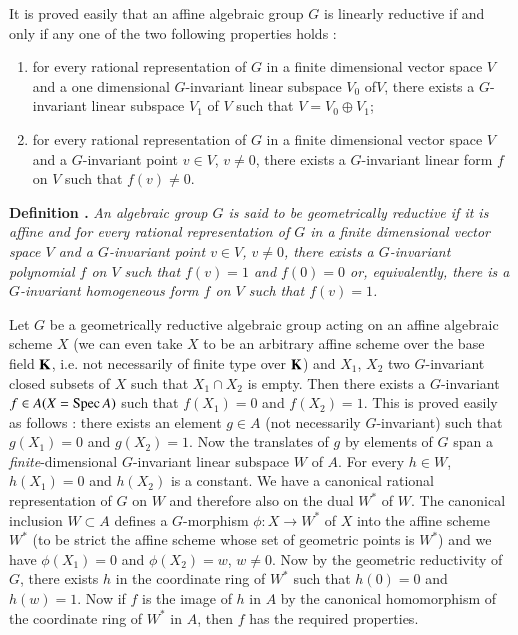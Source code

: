 It is proved easily that an affine algebraic group $G$ is linearly reductive if and only if any one of the two following properties holds :
\begin{enumerate}
\renewcommand{\labelenumi}{(\theenumi)}
\item for every rational representation of $G$ in a finite dimensional vector space $V$ and a one dimensional $G$-invariant linear subspace $V_{0}$ of\pageoriginale $V$, there exists a $G$-invariant linear subspace $V_{1}$ of $V$ such that $V=V_{0}\oplus V_{1}$;

\item for every rational representation of $G$ in a finite dimensional vector space $V$ and a $G$-invariant point $v\in V$, $v\neq 0$, there exists a $G$-invariant linear form $f$ on $V$ such that $f(v)\neq 0$.
\end{enumerate}

\medskip
\noindent
{\bf Definition .\label{art18-defi3}}
{\em An algebraic group $G$ is said to be geometrically reductive if it is affine and for every rational representation of $G$ in a finite dimensional vector space $V$ and a $G$-invariant point $v\in V$, $v\neq 0$, there exists a $G$-invariant polynomial $f$ on $V$ such that $f(v)=1$ and $f(0)=0$ or, equivalently, there is a $G$-invariant homogeneous form $f$ on $V$ such that $f(v)=1$.}
\smallskip

Let $G$ be a geometrically reductive algebraic group acting on an affine algebraic scheme $X$ (we can even take $X$ to be an arbitrary affine scheme over the base field $\mathbf{K}$, i.e. not necessarily of finite type over $\mathbf{K}$) and $X_{1}$, $X_{2}$ two $G$-invariant closed subsets of $X$ such that $X_{1}\cap X_{2}$ is empty. Then there exists a $G$-invariant $f\in A(X=\operatorname{Spec} A)$ such that $f(X_{1})=0$ and $f(X_{2})=1$. This is proved easily as follows : there exists an element $g\in A$ (not necessarily $G$-invariant) such that $g(X_{1})=0$ and $g(X_{2})=1$. Now the translates of $g$ by elements of $G$ span a {\em finite}-dimensional $G$-invariant linear subspace $W$ of $A$. For every $h\in W$, $h(X_{1})=0$ and $h(X_{2})$ is a constant. We have a canonical rational representation of $G$ on $W$ and therefore also on the dual $W^{*}$ of $W$. The canonical inclusion $W\subset A$ defines a $G$-morphism $\phi:X\to W^{*}$ of $X$ into the affine scheme $W^{*}$ (to be strict the affine scheme whose set of geometric points is $W^{*}$) and we have $\phi (X_{1})=0$ and $\phi(X_{2})=w$, $w\neq 0$. Now by the geometric reductivity of $G$, there exists $h$ in the coordinate ring of $W^{*}$ such that $h(0)=0$ and $h(w)=1$. Now if $f$ is the image of $h$ in $A$ by the canonical homomorphism of the coordinate ring of $W^{*}$ in $A$, then $f$ has the required properties.

